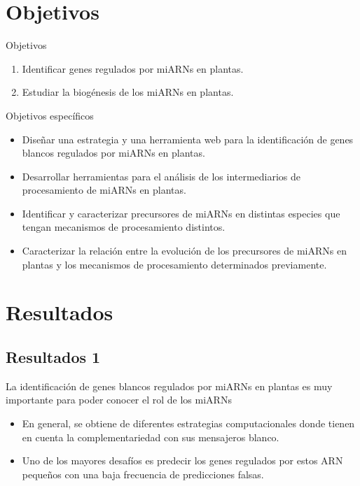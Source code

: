 \documentclass{beamer}
\begin{document}
\section{Objetivos}

\begin{frame}{Objetivos}
	\begin{enumerate}[<+->]
        \item Identificar genes regulados por miARNs en plantas.
        \item Estudiar la biogénesis de los miARNs en plantas.
	\end{enumerate}
\end{frame}

\begin{frame}{Objetivos específicos}
		\pause
		\begin{itemize}
            \item<-2> Diseñar una estrategia y una herramienta web para la identificación de genes blancos regulados por miARNs en plantas.
			\item<-1> Desarrollar herramientas para el análisis de los intermediarios de procesamiento de miARNs en plantas.
			\item<-1> Identificar y caracterizar precursores de miARNs en distintas especies que tengan mecanismos de procesamiento distintos.
			\item<-1> Caracterizar la relación entre la evolución de los precursores de miARNs en plantas y los mecanismos de procesamiento determinados previamente.
        \end{itemize}
\end{frame}


\section{Resultados}

\subsection{Resultados 1}


\begin{frame}{La identificación de genes blancos regulados por miARNs en plantas es muy importante para poder conocer el rol de los miARNs}
	\begin{itemize}
		\item En general, se obtiene de diferentes estrategias computacionales donde tienen en cuenta la complementariedad con sus mensajeros blanco.
        \item Uno de los mayores desafíos es predecir los genes regulados por estos ARN pequeños con una baja frecuencia de predicciones falsas.
	\end{itemize}
\end{frame}
\end{document}
